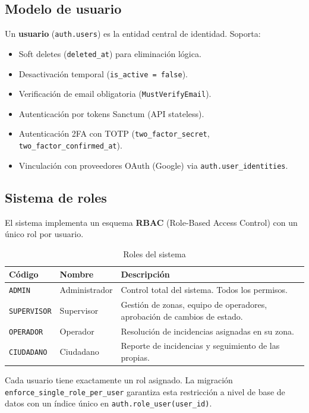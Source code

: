 \documentclass[11pt, a4paper]{article}
\begin{document}
\subsection{Modelo de usuario}

Un \textbf{usuario} (\texttt{auth.users}) es la entidad central de identidad. Soporta:

\begin{itemize}
  \item Soft deletes (\texttt{deleted\_at}) para eliminación lógica.
  \item Desactivación temporal (\texttt{is\_active = false}).
  \item Verificación de email obligatoria (\texttt{MustVerifyEmail}).
  \item Autenticación por tokens Sanctum (API stateless).
  \item Autenticación 2FA con TOTP (\texttt{two\_factor\_secret}, \texttt{two\_factor\_confirmed\_at}).
  \item Vinculación con proveedores OAuth (Google) via \texttt{auth.user\_identities}.
\end{itemize}

\subsection{Sistema de roles}

El sistema implementa un esquema \textbf{RBAC} (Role-Based Access Control) con un único rol por usuario.

\begin{table}[H]
\centering
\begin{tabularx}{\textwidth}{l l X}
  \toprule
  \textbf{Código} & \textbf{Nombre} & \textbf{Descripción} \\
  \midrule
  \texttt{ADMIN}      & Administrador & Control total del sistema. Todos los permisos. \\
  \texttt{SUPERVISOR}  & Supervisor    & Gestión de zonas, equipo de operadores, aprobación de cambios de estado. \\
  \texttt{OPERADOR}    & Operador      & Resolución de incidencias asignadas en su zona. \\
  \texttt{CIUDADANO}   & Ciudadano     & Reporte de incidencias y seguimiento de las propias. \\
  \bottomrule
\end{tabularx}
\caption{Roles del sistema}
\end{table}

\begin{restriccion}
Cada usuario tiene exactamente un rol asignado. La migración \texttt{enforce\_single\_role\_per\_user} garantiza esta restricción a nivel de base de datos con un índice único en \texttt{auth.role\_user(user\_id)}.
\end{restriccion}
\end{document}
